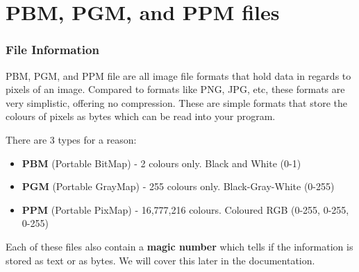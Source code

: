 \documentclass[12pt]{article}
\begin{document}
\section{PBM, PGM, and PPM files}\subsubsection{File Information}PBM, PGM, and PPM file are all image file formats that hold data in regards to pixels of an image.
Compared to formats like PNG, JPG, etc, these formats are very simplistic, offering no compression.
These are simple formats that store the colours of pixels as bytes which can be read into your program.

There are 3 types for a reason:

\begin{itemize}
	\item \textbf{PBM} (Portable BitMap) - 2 colours only. Black and White (0-1)

	\item \textbf{PGM} (Portable GrayMap) - 255 colours only. Black-Gray-White (0-255)

	\item \textbf{PPM} (Portable PixMap) - 16,777,216 colours. Coloured RGB (0-255, 0-255, 0-255)

\end{itemize}
Each of these files also contain a \textbf{magic number} which tells if the information is stored as text or as bytes.
We will cover this later in the documentation.
\end{document}

